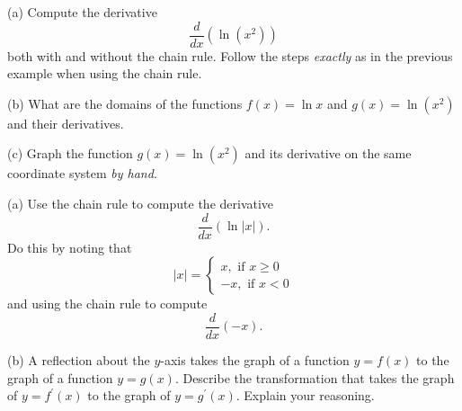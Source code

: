 \documentclass{ximera}
\begin{document}
\begin{question}  \label{Qdfbb44443243}
(a) Compute the derivative 
\[
       \frac{d}{dx} \left( \ln(x^2)  \right)
\]
both with and without the chain rule. Follow the steps \emph{exactly} as in the previous example when using the chain rule.

(b) What are the domains of the functions $f(x)=\ln x$ and $g(x) = \ln (x^2)$ and their derivatives.

(c) Graph the function $g(x) = \ln (x^2)$ and its derivative on the same coordinate system \emph{by hand}.

\end{question}

\begin{question}  \label{Qdefrgbhrdtgr}
(a) Use the chain rule to compute the derivative
\[
   \frac{d}{dx} \left( \ln |x| \right) .
\]
Do this by noting that
\[
|x| = 
\begin{cases}
    x , \text{ if } x\geq 0 \\
   -x ,  \text{ if } x<0
\end{cases}
\]
and using the chain rule to compute 
\[
  \frac{d}{dx}  \left(  -x \right).
\]

(b) A reflection about the $y$-axis takes the graph of a function $y=f(x)$ to the graph of a function $y=g(x)$. Describe the transformation that takes the graph of $y=f^\prime(x)$ to the graph of $y=g^\prime(x)$. Explain your reasoning.

\end{question}
\end{document}
